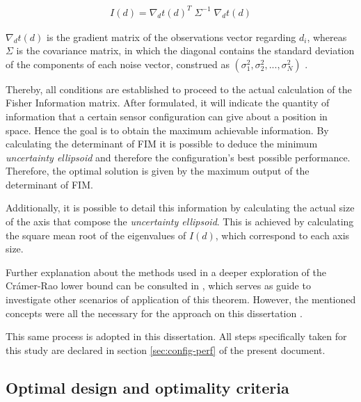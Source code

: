 \begin{eqnarray}
	I(d) = \nabla_{d}t(d)^T \; \Sigma^{-1} \; \nabla_{d}t(d)
	\label{eq:fisher}
\end{eqnarray}

$\nabla_{d}t(d)$ is the gradient matrix of the observations vector regarding $d_i$, whereas $\Sigma$ is the covariance matrix, in which the diagonal contains the standard deviation of the components of each noise vector, construed as $(\sigma_1^2 , \sigma_2^2 , ... , \sigma_N^2)$ .

Thereby, all conditions are established to proceed to the actual calculation of the Fisher Information matrix. After formulated, it will indicate the quantity of information that a certain sensor configuration can give about a position in space. Hence the goal is to obtain the maximum achievable information. By calculating the determinant of FIM it is possible to deduce the minimum \textit{uncertainty ellipsoid} and therefore the configuration's best possible performance. Therefore, the optimal solution is given by the maximum output of the determinant of FIM.

Additionally, it is possible to detail this information by calculating the actual size of the axis that compose the \textit{uncertainty ellipsoid}. This is achieved by calculating the square mean root of the eigenvalues of $I(d)$, which correspond to each axis size.

Further explanation about the methods used in a deeper exploration of the Crámer-Rao lower bound can be consulted in \cite{bishop-cramer-rao}, which serves as guide to investigate other scenarios of application of this theorem. However, the mentioned concepts were all the necessary for the approach on this dissertation .

This same process is adopted in this dissertation. All steps specifically taken for this study are declared in section \ref{sec:config-perf} of the present document.


\subsection{Optimal design and optimality criteria}	\label{sec:optimaldesign}

